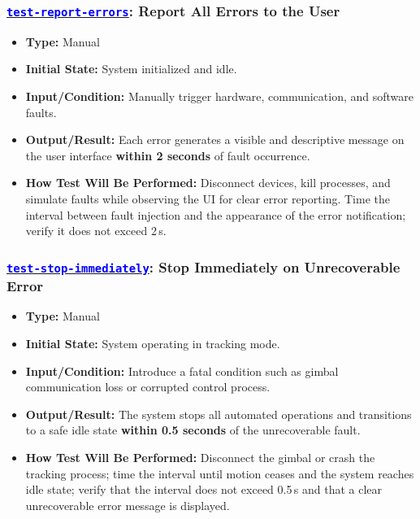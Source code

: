 \documentclass[12pt, titlepage]{article}
\newcommand{\tid}[1]{\hyperlink{tid:#1}{\textcolor{blue}{\texttt{#1}}}}
\begin{document}
\subsubsection*{\tid{test-report-errors}: Report All Errors to the User}
\begin{itemize}
  \item \textbf{Type:} Manual
  \item \textbf{Initial State:} System initialized and idle.
  \item \textbf{Input/Condition:} Manually trigger hardware, communication, and software faults.
  \item \textbf{Output/Result:} Each error generates a visible and descriptive message on the user interface \textbf{within 2 seconds} of fault occurrence.
  \item \textbf{How Test Will Be Performed:} Disconnect devices, kill processes, and simulate faults while observing the UI for clear error reporting. Time the interval between fault injection and the appearance of the error notification; verify it does not exceed 2\,s.
\end{itemize}

\subsubsection*{\tid{test-stop-immediately}: Stop Immediately on Unrecoverable Error}
\begin{itemize}
  \item \textbf{Type:} Manual
  \item \textbf{Initial State:} System operating in tracking mode.
  \item \textbf{Input/Condition:} Introduce a fatal condition such as gimbal communication loss or corrupted control process.
  \item \textbf{Output/Result:} The system stops all automated operations and transitions to a safe idle state \textbf{within 0.5 seconds} of the unrecoverable fault.
  \item \textbf{How Test Will Be Performed:} Disconnect the gimbal or crash the tracking process; time the interval until motion ceases and the system reaches idle state; verify that the interval does not exceed 0.5\,s and that a clear unrecoverable error message is displayed.
\end{itemize}
\end{document}
